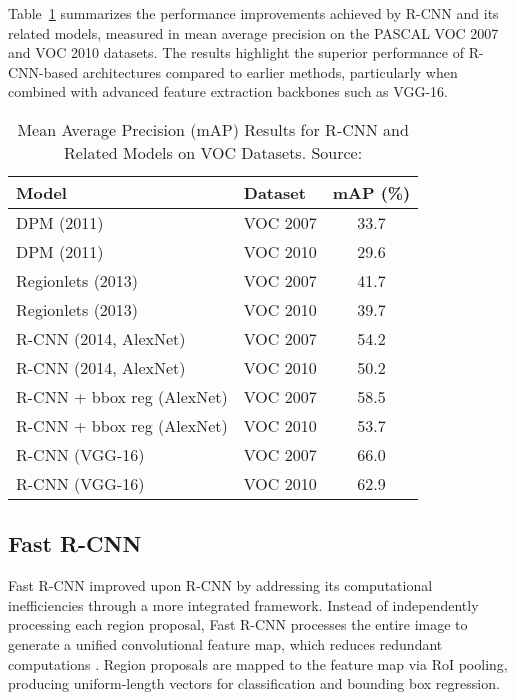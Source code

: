 \documentclass[3p,times]{elsarticle}
\begin{document}
Table~\ref{tab:rcnn_results} summarizes the performance improvements achieved by R-CNN and its related models, measured in mean average precision on the PASCAL VOC 2007 and VOC 2010 datasets. The results highlight the superior performance of R-CNN-based architectures compared to earlier methods, particularly when combined with advanced feature extraction backbones such as VGG-16.
\begin{table}[H]
\centering
\caption{Mean Average Precision (mAP) Results for R-CNN and Related Models on VOC Datasets. Source: \cite{726791}}
\label{tab:rcnn_results}
\begin{tabular}{|l|l|c|}
\hline
\textbf{Model}                   & \textbf{Dataset} & \textbf{mAP (\%)} \\ \hline
DPM (2011)                       & VOC 2007         & 33.7              \\ \hline
DPM (2011)                       & VOC 2010         & 29.6              \\ \hline
Regionlets (2013)                & VOC 2007         & 41.7              \\ \hline
Regionlets (2013)                & VOC 2010         & 39.7              \\ \hline
R-CNN (2014, AlexNet)            & VOC 2007         & 54.2              \\ \hline
R-CNN (2014, AlexNet)            & VOC 2010         & 50.2              \\ \hline
R-CNN + bbox reg (AlexNet)       & VOC 2007         & 58.5              \\ \hline
R-CNN + bbox reg (AlexNet)       & VOC 2010         & 53.7              \\ \hline
R-CNN (VGG-16)                   & VOC 2007         & 66.0              \\ \hline
R-CNN (VGG-16)                   & VOC 2010         & 62.9              \\ \hline
\end{tabular}
\end{table}

\subsection{Fast R-CNN}
Fast R-CNN improved upon R-CNN by addressing its computational inefficiencies through a more integrated framework. Instead of independently processing each region proposal, Fast R-CNN processes the entire image to generate a unified convolutional feature map, which reduces redundant computations \citet{girshick2015fastrcnn}. Region proposals are mapped to the feature map via RoI pooling, producing uniform-length vectors for classification and bounding box regression.
\end{document}
